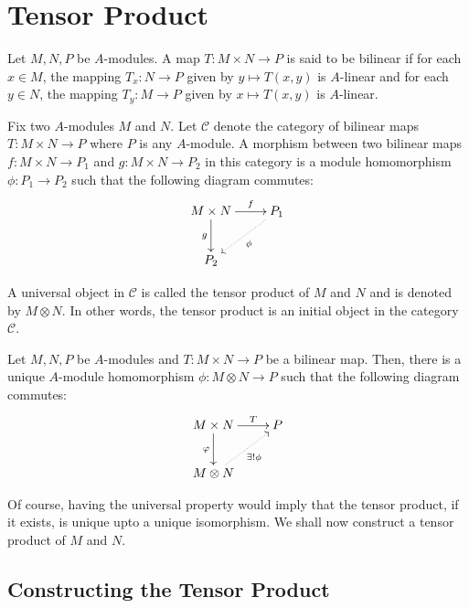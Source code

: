 \section{Tensor Product}

\begin{definition}
    Let $M, N, P$ be $A$-modules. A map $T: M\times N\to P$ is said to be bilinear if for each $x\in M$, the mapping $T_x: N\to P$ given by $y\mapsto T(x,y)$ is $A$-linear and for each $y\in N$, the mapping $T_y: M\to P$ given by $x\mapsto T(x,y)$ is $A$-linear.
\end{definition}

Fix two $A$-modules $M$ and $N$. Let $\mathscr C$ denote the category of bilinear maps $T: M\times N\to P$ where $P$ is any $A$-module. A morphism between two bilinear maps $f: M\times N\to P_1$ and $g: M\times N\to P_2$ in this category is a module homomorphism $\phi: P_1\to P_2$ such that the following diagram commutes: 
\begin{equation*}
\xymatrix {
    M\times N\ar[r]^-f\ar[d]_g & P_1\ar@{.>}[ld]^\phi\\
    P_2
}
\end{equation*}

A universal object in $\mathscr C$ is called the tensor product of $M$ and $N$ and is denoted by $M\otimes N$. In other words, the tensor product is an initial object in the category $\mathscr C$.

\begin{definition}
    Let $M,N,P$ be $A$-modules and $T: M\times N\to P$ be a bilinear map. Then, there is a unique $A$-module homomorphism $\phi: M\otimes N\to P$ such that the following diagram commutes: 
    \begin{equation*}
    \xymatrix {
        M\times N\ar[r]^-T\ar[d]_\varphi & P\\
        M\otimes N\ar@{.>}[ru]_{\exists!\phi}
    }
    \end{equation*}
\end{definition}

Of course, having the universal property would imply that the tensor product, if it exists, is unique upto a unique isomorphism. We shall now construct a tensor product of $M$ and $N$.

\subsection*{Constructing the Tensor Product}

